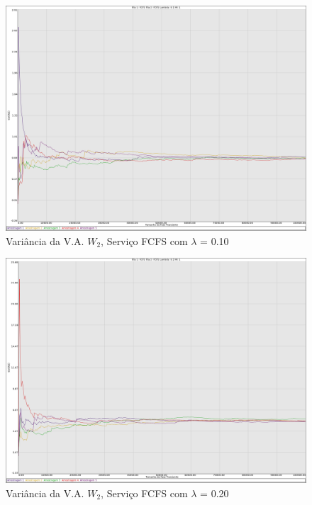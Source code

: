 \documentclass[a4paper,10pt]{article}
\begin{document}
\begin{figure}
	\caption{Variância da V.A. $W_2$, Serviço FCFS com $\lambda$ = 0.10}
	\label{figTransienteFCFSfila2VarWLambda010}
	\includegraphics[scale = 0.20]{./graficos_transiente_2/01.png}
\end{figure}

\begin{figure}
	\caption{Variância da V.A. $W_2$, Serviço FCFS com $\lambda$ = 0.20}
	\label{figTransienteFCFSfila2VarWLambda020}
	\includegraphics[scale = 0.20]{./graficos_transiente_2/02.png}
\end{figure}
\end{document}

